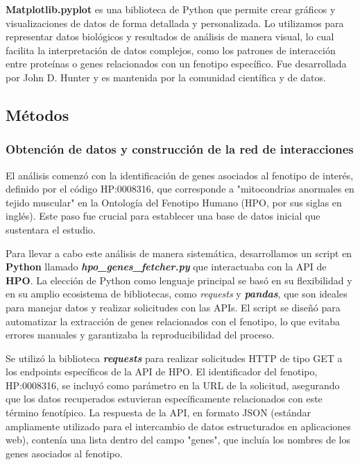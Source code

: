 \textbf{Matplotlib.pyplot} es una biblioteca de Python que permite crear gráficos y visualizaciones de datos de forma detallada y personalizada.
Lo utilizamos para representar datos biológicos y resultados de análisis de manera visual, lo cual facilita la interpretación de datos complejos, como los patrones de interacción entre proteínas o genes relacionados con un fenotipo específico.
Fue desarrollada por John D. Hunter y es mantenida por la comunidad científica y de datos.\cite{ari2014matplotlib}



\subsection{\textbf{Métodos}}

\subsubsection{Obtención de datos y construcción de la red de interacciones}

El análisis comenzó con la identificación de genes asociados al fenotipo de interés, definido por el código HP:0008316, que corresponde a "mitocondrias anormales en tejido muscular" en la Ontología del Fenotipo Humano (HPO, por sus siglas en inglés). Este paso fue crucial para establecer una base de datos inicial que sustentara el estudio.

Para llevar a cabo este análisis de manera sistemática, desarrollamos un script en \textbf{Python} llamado \textbf{\textit{hpo\_genes\_fetcher.py}} que interactuaba con la API de \textbf{HPO}. La elección de Python como lenguaje principal se basó en su flexibilidad y en su amplio ecosistema de bibliotecas, como \textit{requests} y \textbf{\textit{pandas}}, que son ideales para manejar datos y realizar solicitudes con las APIs. El script se diseñó para automatizar la extracción de genes relacionados con el fenotipo, lo que evitaba errores manuales y garantizaba la reproducibilidad del proceso.

Se utilizó la biblioteca \textbf{\textit{requests}} para realizar solicitudes HTTP de tipo GET a los endpoints específicos de la API de HPO. El identificador del fenotipo, HP:0008316, se incluyó como parámetro en la URL de la solicitud, asegurando que los datos recuperados estuvieran específicamente relacionados con este término fenotípico. La respuesta de la API, en formato JSON (estándar ampliamente utilizado para el intercambio de datos estructurados en aplicaciones web), contenía una lista dentro del campo "genes", que incluía los nombres de los genes asociados al fenotipo.

